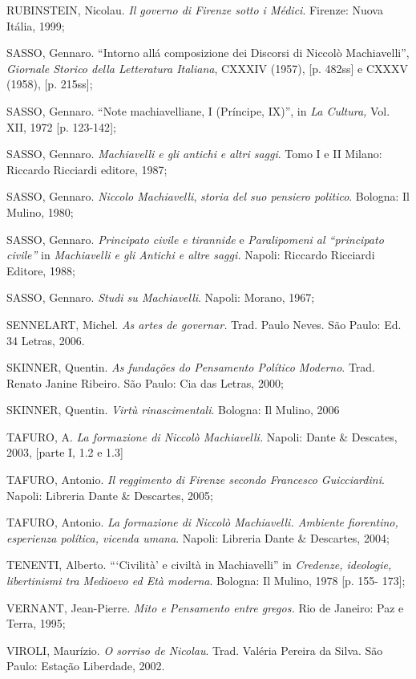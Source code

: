 \begin{Parskip}
RUBINSTEIN, Nicolau. \emph{Il governo di Firenze sotto i Médici}.
Firenze: Nuova Itália, 1999;

SASSO, Gennaro. ``Intorno allá composizione dei Discorsi di Niccolò
Machiavelli'', \emph{Giornale Storico della Letteratura Italiana},
CXXXIV (1957), {[}p. 482ss{]} e CXXXV (1958), {[}p. 215ss{]};

SASSO, Gennaro. ``Note machiavelliane, I (Príncipe, IX)'', in \emph{La
Cultura,} Vol. XII, 1972 {[}p. 123-142{]};

SASSO, Gennaro. \emph{Machiavelli e gli antichi} \emph{e altri saggi}.
Tomo I e II Milano: Riccardo Ricciardi editore, 1987;

SASSO, Gennaro. \emph{Niccolo Machiavelli}, \emph{storia del suo
pensiero politico}. Bologna: Il Mulino, 1980;

SASSO, Gennaro. \emph{Principato civile e tirannide} e
\emph{Paralipomeni al ``principato civile''} in \emph{Machiavelli e gli
Antichi e altre saggi.} Napoli: Riccardo Ricciardi Editore, 1988;

SASSO, Gennaro. \emph{Studi su Machiavelli}. Napoli: Morano, 1967;

SENNELART, Michel. \emph{As artes de governar.} Trad. Paulo Neves. São
Paulo: Ed. 34 Letras, 2006.

SKINNER, Quentin. \emph{As fundações do Pensamento Político Moderno}.
Trad. Renato Janine Ribeiro. São Paulo: Cia das Letras, 2000;

SKINNER, Quentin. \emph{Virtù rinascimentali}. Bologna: Il Mulino, 2006

TAFURO, A. \emph{La formazione di Niccolò Machiavelli.} Napoli: Dante \&
Descates, 2003, {[}parte I, 1.2 e 1.3{]}

TAFURO, Antonio. \emph{Il reggimento di Firenze secondo Francesco
Guicciardini}. Napoli: Libreria Dante \& Descartes, 2005;

TAFURO, Antonio. \emph{La formazione di Niccolò Machiavelli. Ambiente
fiorentino, esperienza política, vicenda umana}. Napoli: Libreria Dante
\& Descartes, 2004;

TENENTI, Alberto. ```Civilità' e civiltà in Machiavelli'' in
\emph{Credenze, ideologie, libertinismi tra Medioevo ed Età moderna}.
Bologna: Il Mulino, 1978 {[}p. 155- 173{]};

VERNANT, Jean-Pierre. \emph{Mito e Pensamento entre gregos.} Rio de
Janeiro: Paz e Terra, 1995;

VIROLI, Maurízio. \emph{O sorriso de Nicolau}. Trad. Valéria Pereira da
Silva. São Paulo: Estação Liberdade, 2002.
\end{Parskip}